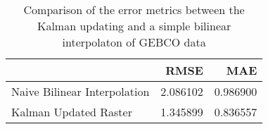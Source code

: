 \begin{table}[h!]
\centering
\caption{Comparison of the error metrics between the Kalman updating and a simple bilinear interpolaton of GEBCO data}
\label{raster_rmse_comparison}
\begin{tabular}{lrr}
\toprule
 & RMSE & MAE \\
\midrule
Naive Bilinear Interpolation & 2.086102 & 0.986900 \\
Kalman Updated Raster & 1.345899 & 0.836557 \\
\bottomrule
\end{tabular}
\end{table}
